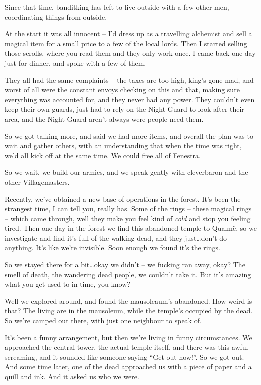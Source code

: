 Since that time, \gls{banditking} has left to live outside with a few other men, coordinating things from outside.

\begin{speechtext}

	At the start it was all innocent -- I'd dress up as a travelling alchemist and sell a magical item for a small price to a few of the local lords.  Then I started selling those scrolls, where you read them and they only work once.  I came back one day just for dinner, and spoke with a few of them.

	They all had the same complaints -- the taxes are too high, \gls{king}'s gone mad, and worst of all were the constant envoys checking on this and that, making sure everything was accounted for, and they never had any power.  They couldn't even keep their own guards, just had to rely on the Night Guard to look after their area, and the Night Guard aren't always were people need them.

	So we got talking more, and said we had more items, and overall the plan was to wait and gather others, with an understanding that when the time was right, we'd all kick off at the same time.  We could free all of Fenestra.

	So we wait, we build our armies, and we speak gently with \gls{cleverbaron} and the other Villagemasters.

	Recently, we've obtained a new base of operations in the forest.  It's been the strangest time, I can tell you, really has.  Some of the rings -- these magical rings -- which came through, well they make you feel kind of \emph{cold} and stop you feeling tired.  Then one day in the forest we find this abandoned temple to Qualm\"{e}, so we investigate and find it's full of the walking dead, and they just\ldots don't do anything.  It's like we're invisible.  Soon enough we found it's the rings.

	So we stayed there for a bit\ldots okay we didn't -- we fucking ran away, okay?  The smell of death, the wandering dead people, we couldn't take it.  But it's amazing what you get used to in time, you know?

	Well we explored around, and found the mausoleaum's abandoned.  How weird is that?  The living are in the mausoleum, while the temple's occupied by the dead.  So we're camped out there, with just one neighbour to speak of.

	It's been a funny arrangement, but then we're living in funny circumstances.  We approached the central tower, the actual temple itself, and there was this awful screaming, and it sounded like someone saying ``Get out now!''.  So we got out.  And some time later, one of the dead approached us with a piece of paper and a quill and ink.  And it asked us who we were.


\end{speechtext}
